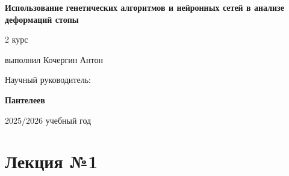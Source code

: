 \documentclass[14pt]{extarticle} %
\begin{document}
\begin{titlepage}
    \centering %
    
    \vspace*{\fill} %
    
    {\LARGE\bfseries Использование генетических алгоритмов и
нейронных сетей в анализе деформаций стопы\par} %
    \vspace{2cm}
    {\Large \par} %
    \vspace{0.5cm}
    {\Large 2 курс \par} %
    \vspace{0.5cm}
    {\Large выполнил Кочергин Антон\par} %
    \vspace{1cm}
    {\large Научный руководитель:\par}
    {\Large\bfseries Пантелеев \par} %
   
    
    \vspace{4cm}
    {\large 2025/2026 учебный год\par} %
    
    \vspace*{\fill} %
\end{titlepage}

\raggedright %
\justifying  %

\newpage

\tableofcontents

\newpage

\setlength{\parindent}{0pt}


\section{Лекция №1 }
\end{document}
